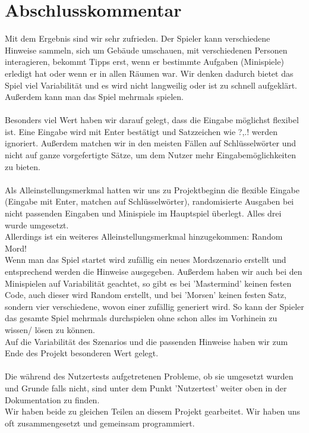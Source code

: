\documentclass[10pt,a4paper]{article}
\begin{document}
\section*{Abschlusskommentar}
Mit dem Ergebnis sind wir sehr zufrieden. Der Spieler kann verschiedene Hinweise sammeln, sich um Gebäude umschauen, mit verschiedenen Personen interagieren, bekommt Tipps erst, wenn er bestimmte Aufgaben (Minispiele) erledigt hat oder wenn er in allen Räumen war. Wir denken dadurch bietet das Spiel viel Variabilität und es wird nicht langweilig oder ist zu schnell aufgeklärt. Außerdem kann man das Spiel mehrmals spielen.\\
\\
Besonders viel Wert haben wir darauf gelegt, dass die Eingabe möglichst flexibel ist. Eine Eingabe wird mit Enter bestätigt und Satzzeichen wie ?,.! werden ignoriert. Außerdem matchen wir in den meisten Fällen auf Schlüsselwörter und nicht auf ganze vorgefertigte Sätze, um dem Nutzer mehr Eingabemöglichkeiten zu bieten. \\
\\
Als Alleinstellungsmerkmal hatten wir uns zu Projektbeginn die flexible Eingabe (Eingabe mit Enter, matchen auf Schlüsselwörter), randomisierte Ausgaben bei nicht passenden Eingaben und Minispiele im Hauptspiel überlegt. Alles drei wurde umgesetzt. \\
Allerdings ist ein weiteres Alleinstellungsmerkmal hinzugekommen: Random Mord!\\
Wenn man das Spiel startet wird zufällig ein neues Mordszenario erstellt und entsprechend werden die Hinweise ausgegeben. Außerdem haben wir auch bei den Minispielen auf Variabilität geachtet, so gibt es bei 'Mastermind' keinen festen Code, auch dieser wird Random erstellt, und bei 'Morsen' keinen festen Satz, sondern vier verschiedene, wovon einer zufällig generiert wird. So kann der Spieler das gesamte Spiel mehrmals durchspielen ohne schon alles im Vorhinein zu wissen/ lösen zu können.\\
Auf die Variabilität des Szenarios und die passenden Hinweise haben wir zum Ende des Projekt besonderen Wert gelegt.\\
\\
Die während des Nutzertests aufgetretenen Probleme, ob sie umgesetzt wurden und Grunde falls nicht, sind unter dem Punkt 'Nutzertest' weiter oben in der Dokumentation zu finden.\\
Wir haben beide zu gleichen Teilen an diesem Projekt gearbeitet. Wir haben uns oft zusammengesetzt und gemeinsam programmiert.\\
\end{document}
